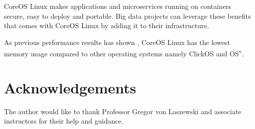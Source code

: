 \documentclass[9pt,twocolumn,twoside]{../../styles/osajnl}
\begin{document}
CoreOS Linux makes applications and microservices running on
containers secure, easy to deploy and portable. Big data projects can
leverage these benefits that comes with CoreOS Linux by adding it to
their infrastructure.

As previous performance results has shown \cite{2016NFVSolutions},
CoreOS Linux has the lowest memory usage compared to other
operating systems namely ClickOS and OS\textsuperscript{v}.


\section*{Acknowledgements}
The author would like to thank Professor Gregor von Laszewski and
associate instructors for their help and guidance.





 

\newpage

\appendix
\end{document}
